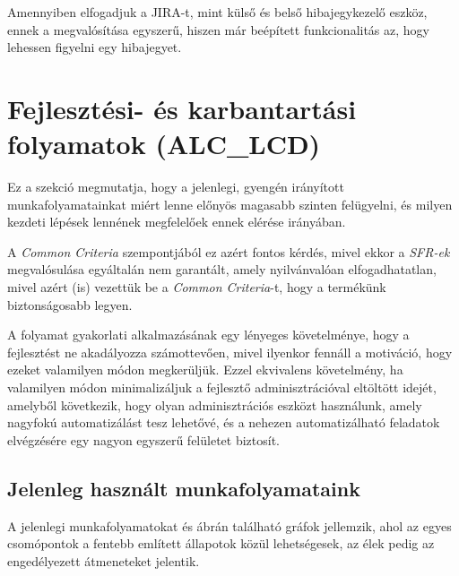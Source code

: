 Amennyiben elfogadjuk a JIRA-t, mint külső és belső hibajegykezelő eszköz, ennek a megvalósítása
egyszerű, hiszen már beépített funkcionalitás az, hogy lehessen figyelni egy hibajegyet.




\section{Fejlesztési- és karbantartási folyamatok (ALC\_LCD)}
Ez a szekció megmutatja, hogy a jelenlegi, gyengén irányított munkafolyamatainkat miért lenne
előnyös magasabb szinten felügyelni, és milyen kezdeti lépések lennének megfelelőek ennek elérése
irányában.

A \emph{Common Criteria} szempontjából ez azért fontos kérdés, mivel ekkor a \emph{SFR-ek}
megvalósulása egyáltalán nem garantált, amely nyilvánvalóan elfogadhatatlan, mivel azért (is)
vezettük be a \emph{Common Criteria}-t, hogy a termékünk biztonságosabb legyen.

A folyamat gyakorlati alkalmazásának egy lényeges követelménye, hogy a fejlesztést ne akadályozza
számottevően, mivel ilyenkor fennáll a motiváció, hogy ezeket valamilyen módon megkerüljük. Ezzel
ekvivalens követelmény, ha valamilyen módon minimalizáljuk a fejlesztő adminisztrációval eltöltött
idejét, amelyből következik, hogy olyan adminisztrációs eszközt használunk, amely nagyfokú
automatizálást tesz lehetővé, és a nehezen automatizálható feladatok elvégzésére egy nagyon egyszerű
felületet biztosít.

\subsection{Jelenleg használt munkafolyamataink}
A jelenlegi munkafolyamatokat  és  ábrán található gráfok
jellemzik, ahol az egyes csomópontok a fentebb említett állapotok közül lehetségesek, az élek pedig
az engedélyezett átmeneteket jelentik.

